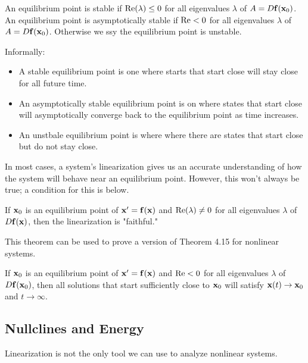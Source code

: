 \documentclass[../m082main.tex]{subfiles}
\begin{document}
\begin{definition}
    An equilibrium point is stable if $\textrm{Re} (\lambda) \leq 0$ for all eigenvalues $\lambda$ of $A = D \mathbf{f} (\mathbf{x}_0)$.
    An equilibrium point is asymptotically stable if $\textrm{Re} < 0$ for all eigenvalues $\lambda$ of $A = D \mathbf{f} (\mathbf{x}_0)$.
    Otherwise we ssy the equilibrium point is unstable.
\end{definition}

Informally:
\begin{itemize}
    \item A stable equilibrium point is one where starts that start close will stay close for all future time.
    \item An asymptotically stable equilibrium point is on where states that start close will asymptotically converge back to the equilibrium point as time increases.
    \item An unstbale equilibrium point is where where there are states that start close but do not stay close.
\end{itemize}
In most cases, a system's linearization gives us an accurate understanding of how the system will behave near an equilibrium point.
However, this won't always be true; a condition for this is below.

\begin{theorem}
    If $\mathbf{x}_0$ is an equilibrium point of $\mathbf{x}'= \mathbf{f}(\mathbf{x})$ and $\textrm{Re} (\lambda) \neq 0$ for all eigenvalues $\lambda$ of $D \mathbf{f} (\mathbf{x})$, then the linearization is "faithful."
\end{theorem}

This theorem can be used to prove a version of Theorem 4.15 for nonlinear systems.

\begin{theorem}
    If $\mathbf{x}_0$ is an equilibrium point of $\mathbf{x}' = \mathbf{f} (\mathbf{x})$ and $\textrm{Re} < 0$ for all eigenvalues $\lambda$ of $D \mathbf{f} (\mathbf{x}_0)$, then all solutions that start sufficiently close to $\mathbf{x}_0$ will satisfy $\mathbf{x}(t) \to \mathbf{x}_0$ and $t \to \infty$.
\end{theorem}

\subsection{Nullclines and Energy}
Linearization is not the only tool we can use to analyze nonlinear systems.
\end{document}
